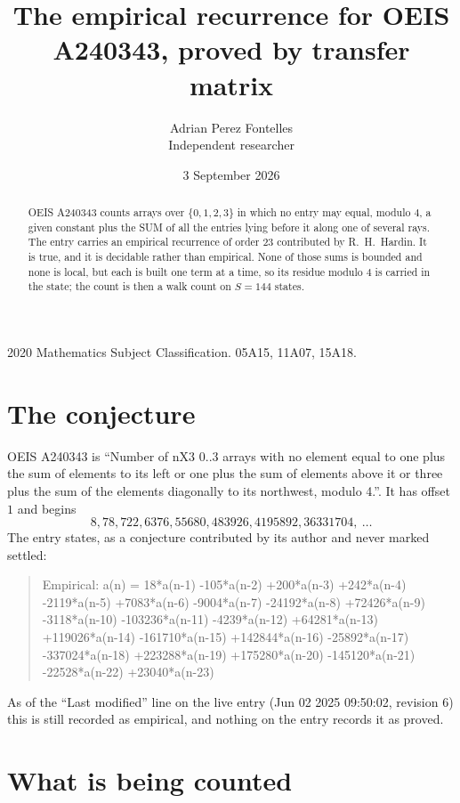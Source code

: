 \documentclass[11pt,a4paper]{article}
\title{The empirical recurrence for OEIS A240343, proved by transfer matrix}
\author{Adrian Perez Fontelles\\ \small Independent researcher}
\date{3 September 2026}
\theoremstyle{plain}
\theoremstyle{definition}
\begin{document}
\maketitle

\begin{abstract}
OEIS A240343 counts arrays over $\{0,1,2,3\}$ in which no entry may equal, modulo $4$, a given
constant plus the SUM of all the entries lying before it along one of several rays. The entry
carries an empirical recurrence of order $23$ contributed by R.~H.~Hardin. It is true, and
it is decidable rather than empirical. None of those sums is bounded and none is local, but
each is built one term at a time, so its residue modulo $4$ is carried in the state; the
count is then a walk count on $S=144$ states.
\end{abstract}

\noindent\small 2020 Mathematics Subject Classification. 05A15, 11A07, 15A18.\normalsize

\section{The conjecture}

OEIS A240343 is ``Number of nX3 0..3 arrays with no element equal to one plus the sum of elements to its left or one plus the sum of elements above it or three plus the sum of the elements diagonally to its northwest, modulo 4.''. It has offset $1$ and begins
\[
8, 78, 722, 6376, 55680, 483926, 4195892, 36331704,\ \dots
\]
The entry states, as a conjecture contributed by its author and never marked settled:
\begin{quote}
Empirical: a(n) = 18*a(n-1) -105*a(n-2) +200*a(n-3) +242*a(n-4) -2119*a(n-5) +7083*a(n-6) -9004*a(n-7) -24192*a(n-8) +72426*a(n-9) -3118*a(n-10) -103236*a(n-11) -4239*a(n-12) +64281*a(n-13) +119026*a(n-14) -161710*a(n-15) +142844*a(n-16) -25892*a(n-17) -337024*a(n-18) +223288*a(n-19) +175280*a(n-20) -145120*a(n-21) -22528*a(n-22) +23040*a(n-23)
\end{quote}
As of the ``Last modified'' line on the live entry (Jun 02 2025 09:50:02, revision 6) this is still
recorded as empirical, and nothing on the entry records it as proved.

\section{What is being counted}
\end{document}
